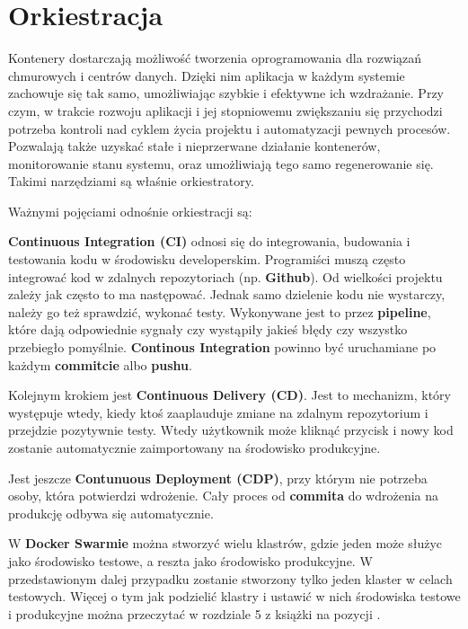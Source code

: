 \documentclass{iiuwb}
\begin{document}
\cleardoublepage
\chapter{Orkiestracja}
\label{cha:Orkiestratory}

Kontenery dostarczają możliwość tworzenia oprogramowania dla
rozwiązań chmurowych i centrów danych. Dzięki nim aplikacja
w każdym systemie zachowuje się tak samo, umożliwiając szybkie
i efektywne ich wzdrażanie. Przy czym, w trakcie rozwoju aplikacji
i jej stopniowemu zwiększaniu się przychodzi potrzeba kontroli
nad cyklem życia projektu i automatyzacji pewnych procesów. 
Pozwalają także uzyskać stałe i nieprzerwane działanie kontenerów, 
monitorowanie stanu systemu, oraz umożliwiają tego samo 
regenerowanie się. Takimi narzędziami są właśnie orkiestratory.\newline


Ważnymi pojęciami odnośnie orkiestracji są: 

\textbf{Continuous Integration (CI)} odnosi się 
do integrowania, budowania i testowania kodu 
w środowisku developerskim. Programiści muszą często 
integrować kod w zdalnych repozytoriach (np. \textbf{Github}).
Od wielkości projektu zależy jak często to ma następować.
Jednak samo dzielenie kodu nie wystarczy, należy go też
sprawdzić, wykonać testy. Wykonywane jest to przez 
\textbf{pipeline}, które dają odpowiednie sygnały czy 
wystąpiły jakieś błędy czy wszystko przebiegło pomyślnie.
\textbf{Continous Integration} powinno być uruchamiane po 
każdym \textbf{commitcie} albo \textbf{pushu}. 

Kolejnym krokiem jest \textbf{Continuous Delivery (CD)}. 
Jest to mechanizm, który występuje wtedy, kiedy ktoś zaaplauduje
zmiane na zdalnym repozytorium i przejdzie pozytywnie testy. 
Wtedy użytkownik może kliknąć przycisk i nowy kod zostanie 
automatycznie zaimportowany na środowisko produkcyjne. 

Jest jeszcze \textbf{Contunuous Deployment (CDP)}, przy którym
nie potrzeba osoby, która potwierdzi wdrożenie. Cały proces 
od \textbf{commita} do wdrożenia na produkcję odbywa się
automatycznie.

W \textbf{Docker Swarmie} można stworzyć wielu klastrów,
gdzie jeden może służyc jako środowisko testowe, a reszta
jako środowisko produkcyjne. W przedstawionym dalej przypadku 
zostanie stworzony tylko jeden klaster w celach testowych. 
Więcej o tym jak podzielić klastry i ustawić w nich środowiska 
testowe i produkcyjne można przeczytać w rozdziale 5 z książki
na pozycji \cite{DockerSwarm}.
\end{document}
